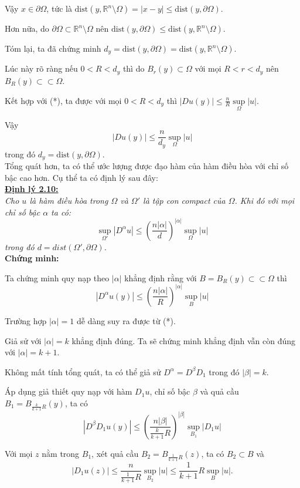 Vậy $x\in\partial\Omega$, tức là $\mbox{dist}(y,\mathbb{R}^n\setminus \Omega)=|x-y|\leq \mbox{dist}(y,\partial\Omega)$.

Hơn nữa, do $\partial\Omega \subset \mathbb{R}^n\setminus\Omega$ nên $\mbox{dist}(y,\partial\Omega) \leq \mbox{dist}(y,\mathbb{R}^n\setminus \Omega)$.

Tóm lại, ta đã chứng minh $d_y=\mbox{dist}(y,\partial\Omega)= \mbox{dist}(y,\mathbb{R}^n\setminus \Omega)$.

Lúc này rõ ràng nếu $0< R < d_y$ thì do $B_r(y)\subset\Omega$ với mọi $R<r<d_y$ nên $B_R(y)\subset\subset\Omega$.

Kết hợp với (*), ta được với mọi $0< R < d_y$ thì $|Du(y)|\leq \frac{n}{R}\sup\limits_{\Omega}|u|$.

Vậy \[|Du(y)|\leq \frac{n}{d_y}\sup\limits_{\Omega}|u|\] trong đó $d_y=\mbox{dist}(y,\partial\Omega)$.
\\

Tổng quát hơn, ta có thể ước lượng được đạo hàm của hàm điều hòa với chỉ số bậc cao hơn. Cụ thể ta có định lý sau đây:\\
\textbf{\underline{Định lý 2.10:}}
\\
\textit{Cho $u$ là hàm điều hòa trong $ \Omega $ và $ \Omega ' $ là tập con compact của $ \Omega $. Khi đó với mọi chỉ số bậc $ \alpha $ ta có:
\[ \sup\limits_{\Omega '}|D^{\alpha}u|\leq(\frac{n|\alpha|}{d})^{|\alpha|}\sup\limits_{\Omega}|u| \]
trong đó $ d = dist(\Omega ',\partial\Omega) $.}
\\
\textbf{Chứng minh:}

Ta chứng minh quy nạp theo $|\alpha |$ khẳng định rằng với $B=B_{R}(y)\subset\subset \Omega$ thì
\[ |D^{\alpha}u(y)|\leq(\frac{n|\alpha|}{R})^{|\alpha|}\sup\limits_{B}|u| \]

Trường hợp $|\alpha |=1$ dễ dàng suy ra được từ (*).

Giả sử với $|\alpha |=k$ khẳng định đúng. Ta sẽ chứng minh khẳng định vẫn còn đúng với $|\alpha |=k+1$.

Không mất tính tổng quát, ta có thể giả sử $D^{\alpha}=D^{\beta}D_{1}$ trong đó $|\beta |=k$.

Áp dụng giả thiết quy nạp với hàm $D_{1}u$, chỉ số bậc $\beta$ và quả cầu $B_1=B_{\frac{k}{k+1}R}(y)$, ta có
\[ |D^{\beta}D_{1}u(y)|\leq(\frac{n|\beta|}{\frac{k}{k+1}R})^{|\beta|}\sup\limits_{B_1}|D_{1}u| \]

Với mọi $z$ nằm trong $B_1$, xét quả cầu $B_2=B_{\frac{1}{k+1}R}(z)$, ta có $B_2\subset B$ và
\[ |D_{1}u(z)|\leq \frac{n}{\frac{1}{k+1}R} \sup\limits_{B_2}|u|\leq \frac{1}{k+1}R \sup\limits_{B}|u|.\]

